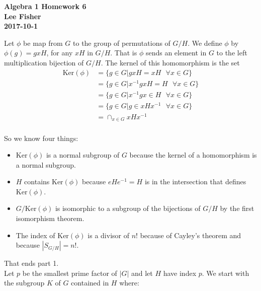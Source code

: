 \documentclass[12pt]{report}
\begin{document}
\textbf{Algebra 1 Homework 6}\\
\indent \textbf{Lee Fisher}\\
\indent \textbf{2017-10-1}

\vspace{0.3cm}

 Let $\phi$ be map from $G$ to the group of permutations
of $G/H$. We define $\phi$ by $\phi(g) = gxH$, for any $xH$ in $G/H$. That is
$\phi$ sends an element in $G$ to the left multiplication bijection of $G/H$.
The kernel of this homomorphism is the set
\begin{align*}
\textrm{Ker}(\phi) &= \{g \in G | gxH = xH       \textrm{ } \forall x \in G \}\\
                   &= \{g \in G | x^{-1}gxH = H  \textrm{ } \forall x \in G \}\\
                   &= \{g \in G | x^{-1}gx \in H \textrm{ } \forall x \in G \}\\
                   &= \{g \in G | g \in xHx^{-1} \textrm{ } \forall x \in G \}\\
                   &= \cap_{x \in G} xHx^{-1}\\
\end{align*}

So we know four things:
\begin{itemize}
\item $\textrm{Ker}(\phi)$ is a normal subgroup of $G$ because the kernel of a
      homomorphism is a normal subgroup.\\

\item $H$ contains $\textrm{Ker}(\phi)$ because $eHe^{-1} = H$ is in the
      intersection that defines $\textrm{Ker}(\phi)$.\\

\item $G/\textrm{Ker}(\phi)$ is isomorphic to a subgroup of the bijections of
      $G/H$ by the first isomorphism theorem.\\

\item The index of $\textrm{Ker}(\phi)$ is a divisor of $n!$ because of Cayley's
      theorem and because $|S_{G/H}| = n!$.\\
\end{itemize}

That ends part 1.\\

 Let $p$ be the smallest prime factor of $|G|$ and
let $H$ have index $p$. We start with the subgroup $K$ of $G$ contained in
$H$ where: \\
\end{document}
